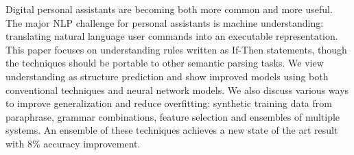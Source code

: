 Digital personal assistants are becoming both more common and more useful. The major NLP challenge for personal assistants is machine understanding: translating natural language user commands into an executable representation. This paper focuses on understanding rules written as If-Then statements, though the techniques should be portable to other semantic parsing tasks. We view understanding as structure prediction and show improved models using both conventional techniques and neural network models. We also discuss various ways to improve generalization and reduce overfitting: synthetic training data from paraphrase, grammar combinations, feature selection and ensembles of multiple systems. An ensemble of these techniques achieves a new state of the art result with 8\% accuracy improvement.
